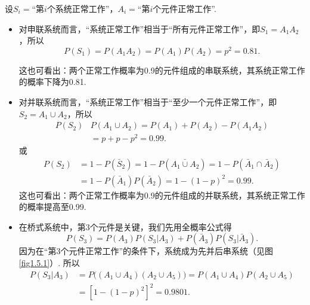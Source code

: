 \begin{solution}
    设$S_i=$“第$i$个系统正常工作”，$A_i=$“第$i$个元件正常工作”.

    \begin{itemize}[(1)]
        \item 对申联系统而言，“系统正常工作”相当于“所有元件正常工作”，即$S_1=A_1A_2$，所以
        \[
            P(S_1) = P(A_1A_2) = P(A_1)P(A_2) = p^2 = 0.81.
        \]

        这也可看出：两个正常工作概率为0.9的元件组成的串联系统，其系统正常工作的概率下降为0.81.

        \item 对并联系统而言，“系统正常工作”相当于“至少一个元件正常工作”，即$S_2=A_1\cup A_2$，所以
        \begin{align*}
            P(S_2) & P(A_1\cup A_2) = P(A_1) + P(A_2) - P(A_1A_2) \\
                   & = p + p - p^2 = 0.99.
        \end{align*}
        或
        \begin{align*}
            P(S_2) & = 1 - P(\bar S_2) = 1 - P(\bar{A_1\cup A_2}) = 1 - P(\bar A_1\cap \bar A_2) \\
                   & = 1 - P(\bar A_1)P(\bar A_2) = 1 - (1-p)^2 = 0.99.
        \end{align*}
        这也可看出：两个正常工作概率为0.9的元件组成的并联系统，其系统正常工作的概率提高至0.99.

        \item 在桥式系统中，第3个元件是关键，我们先用全概率公式得
        \[
            P(S_3) = P(A_3)P(S_3|A_3) + P(\bar A_3)P(S_3|\bar A_3).
        \]
        因为在“第3个元件正常工作”的条件下，系统成为先并后串系统（见图 \ref{fig1.5.1}）. 所以
        \begin{align*}
            P(S_3|A_3) & = P\big( ( A_1\cup A_4 )
            (A_2 \cup A_5) \big) = P(A_1\cup A_4)P(A_2\cup A_5) \\
                       & = [ 1 - (1-p)^2 ]^2 = 0.9801.
        \end{align*}


\end{itemize}
\end{solution}
